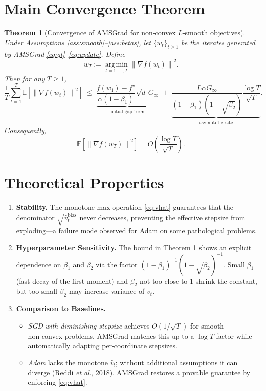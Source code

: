\documentclass{article}
\newtheorem{theorem}{Theorem}
\newcommand{\EE}{\mathbb{E}}
\newcommand{\norm}[1]{\left\|#1\right\|}
\newcommand{\argmin}{\operatorname*{arg\,min}}
\begin{document}
\section*{Main Convergence Theorem}
\begin{theorem}[Convergence of AMSGrad for non‑convex $L$‑smooth objectives]\label{thm:main}
Under Assumptions \ref{ass:smooth}–\ref{ass:betas}, let $\{w_t\}_{t\ge 1}$ be the iterates generated by AMSGrad \eqref{eq:gt}–\eqref{eq:update}.  Define
\[
\bar w_T := \argmin_{t=1,\dots,T}\norm{\nabla f(w_t)}^{2}.
\]
Then for any $T\ge 1$,
\[
\frac{1}{T}\sum_{t=1}^{T}\EE\!\left[\norm{\nabla f(w_t)}^{2}\right]
\;\le\;
\underbrace{\frac{f(w_{1})-f^{\star}}{\alpha(1-\beta_{1})}\sqrt{d}\,G_{\infty}}_{\text{initial gap term}}
\;+\;
\underbrace{\frac{L\alpha G_{\infty}}{(1-\beta_{1})(1-\sqrt{\beta_{2}})}\frac{\log T}{\sqrt{T}}}_{\text{asymptotic rate}}.
\]
Consequently,
\[
\EE\!\left[\norm{\nabla f(\bar w_T)}^{2}\right]=O\!\left(\frac{\log T}{\sqrt{T}}\right).
\]
\end{theorem}

\section*{Theoretical Properties}
\begin{enumerate}[label=\arabic*.]
\item \textbf{Stability.} The monotone max operation \eqref{eq:vhat} guarantees that the denominator $\sqrt{\hat v_t^{\text{bias}}}$ never decreases, preventing the effective stepsize from exploding—a failure mode observed for Adam on some pathological problems.
\item \textbf{Hyperparameter Sensitivity.} The bound in Theorem \ref{thm:main} shows an explicit dependence on $\beta_{1}$ and $\beta_{2}$ via the factor $(1-\beta_{1})^{-1}(1-\sqrt{\beta_{2}})^{-1}$.  Small $\beta_{1}$ (fast decay of the first moment) and $\beta_{2}$ not too close to $1$ shrink the constant, but too small $\beta_{2}$ may increase variance of $v_t$.
\item \textbf{Comparison to Baselines.}
    \begin{itemize}
        \item \emph{SGD with diminishing stepsize} achieves $O(1/\sqrt{T})$ for smooth non‑convex problems.  AMSGrad matches this up to a $\log T$ factor while automatically adapting per‑coordinate stepsizes.
        \item \emph{Adam} lacks the monotone $\hat v_t$; without additional assumptions it can diverge (Reddi \emph{et al.}, 2018).  AMSGrad restores a provable guarantee by enforcing \eqref{eq:vhat}.
    \end{itemize}
\end{enumerate}
\end{document}
